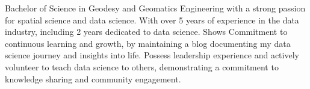 Bachelor of Science in Geodesy and Geomatics Engineering with a strong passion for spatial science and data science. With over 5 years of experience in the data industry, including 2 years dedicated to data science. Shows Commitment to continuous learning and growth, by maintaining a blog documenting my data science journey and insights into life. Possess leadership experience and actively volunteer to teach data science to others, demonstrating a commitment to knowledge sharing and community engagement.